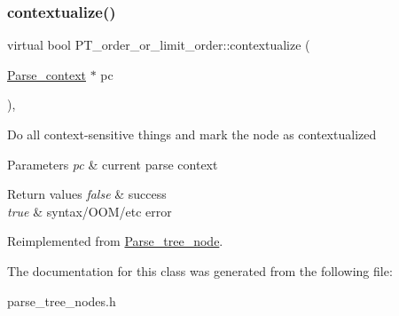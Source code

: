 \subsubsection{\texorpdfstring{contextualize()}{contextualize()}}
{\footnotesize\ttfamily virtual bool P\+T\+\_\+order\+\_\+or\+\_\+limit\+\_\+order\+::contextualize (\begin{DoxyParamCaption}\item[{\mbox{\hyperlink{structParse__context}{Parse\+\_\+context}} $\ast$}]{pc }\end{DoxyParamCaption})\hspace{0.3cm}{\ttfamily [inline]}, {\ttfamily [virtual]}}

Do all context-\/sensitive things and mark the node as contextualized


\begin{DoxyParams}{Parameters}
{\em pc} & current parse context\\
\hline
\end{DoxyParams}

\begin{DoxyRetVals}{Return values}
{\em false} & success \\
\hline
{\em true} & syntax/\+O\+O\+M/etc error \\
\hline
\end{DoxyRetVals}


Reimplemented from \mbox{\hyperlink{classParse__tree__node_a22d93524a537d0df652d7efa144f23da}{Parse\+\_\+tree\+\_\+node}}.



The documentation for this class was generated from the following file\+:\begin{DoxyCompactItemize}
\item 
parse\+\_\+tree\+\_\+nodes.\+h\end{DoxyCompactItemize}
